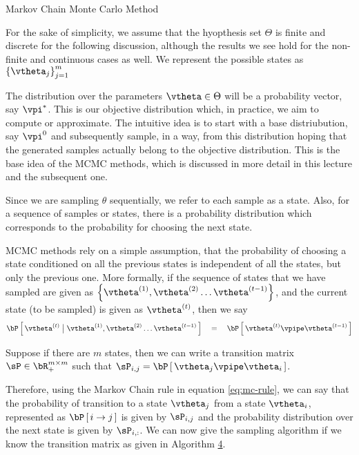 \documentclass[11pt,a4paper]{article}
\begin{document}
\begin{ssection}{Markov Chain Monte Carlo Method}

	For the sake of simplicity, we assume that the hyopthesis set $\Theta$ is finite and discrete for the following discussion, although the results we see hold for the non-finite and continuous cases as well. We represent the possible states as $\set{\vtheta_j}_{j = 1}^m$

	The distribution over the parameters $\vtheta \in \Theta$ will be a probability vector, say $\vpi^{\ast}$. This is our objective distribution which, in practice, we aim to compute or approximate. The intuitive idea is to start with a base distriubution, say $\vpi^0$ and subsequently sample, in a way, from this distribution hoping that the generated samples actually belong to the objective distribution. This is the base idea of the MCMC methods, which is discussed in more detail in this lecture and the subsequent one.

	Since we are sampling $\theta$ sequentially, we refer to each sample as a state. Also, for a sequence of samples or states, there is a probability distribution which corresponds to the probability for choosing the next state.

	MCMC methods rely on a simple assumption, that the probability of choosing a state conditioned on all the previous states is independent of all the states, but only the previous one. More formally, if the sequence of states that we have sampled are given as $\set{\vtheta^{(1)}, \vtheta^{(2)} \dots \vtheta^{(t - 1)}}$, and the current state (to be sampled) is given as $\vtheta^{(t)}$, then we say
	\begin{equation}
		\prob{\vtheta^{(t)} \pipe \vtheta^{(1)}, \vtheta^{(2)} \dots \vtheta^{(t - 1)}} \eq \prob{\vtheta^{(t)} \vpipe \vtheta^{(t - 1)}}
		\label{eq:mc-rule}
	\end{equation}

	Suppose if there are $m$ states, then we can write a transition matrix $\sP \in \bR_+^{m \times m}$ such that $\sP_{i, j} = \prob{\vtheta_j \vpipe \vtheta_i}$.

	Therefore, using the Markov Chain rule in equation \ref{eq:mc-rule}, we can say that the probability of transition to a state $\vtheta_j$ from a state $\vtheta_i$, represented as $\prob{i \ra j}$ is given by $\sP_{i, j}$ and the probability distribution over the next state is given by $\sP_{i, :}$. We can now give the sampling algorithm if we know the transition matrix as given in Algorithm \hyperlink{algo:4}{4}.


\end{ssection}
\end{document}
